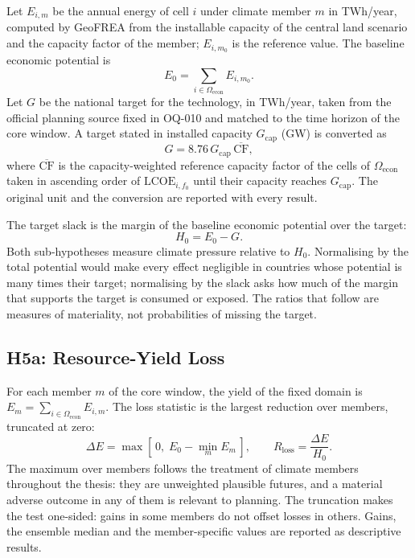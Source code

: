 Let $E_{i,m}$ be the annual energy of cell $i$ under climate member $m$ in
TWh/year, computed by GeoFREA from the installable capacity of the central land
scenario and the capacity factor of the member; $E_{i,m_0}$ is the reference
value. The baseline economic potential is
\begin{equation}
    E_{0}=\sum_{i\in\Omega_{\mathrm{econ}}}E_{i,m_0}.
    \label{eq:h5_baseline}
\end{equation}
Let $G$ be the national target for the technology, in TWh/year, taken from the
official planning source fixed in OQ-010 and matched to the time horizon of the
core window. A target stated in installed capacity $G_{\mathrm{cap}}$ (GW) is
converted as
\begin{equation}
    G=8.76\,G_{\mathrm{cap}}\,\overline{\mathrm{CF}},
    \label{eq:h5_conversion}
\end{equation}
where $\overline{\mathrm{CF}}$ is the capacity-weighted reference capacity factor
of the cells of $\Omega_{\mathrm{econ}}$ taken in ascending order of
$\mathrm{LCOE}_{i,f_0}$ until their capacity reaches $G_{\mathrm{cap}}$. The
original unit and the conversion are reported with every result.

The target slack is the margin of the baseline economic potential over the
target:
\begin{equation}
    H_0=E_0-G .
    \label{eq:h5_slack}
\end{equation}
Both sub-hypotheses measure climate pressure relative to $H_0$. Normalising by
the total potential would make every effect negligible in countries whose
potential is many times their target; normalising by the slack asks how much of
the margin that supports the target is consumed or exposed. The ratios that
follow are measures of materiality, not probabilities of missing the target.

\subsection{H5a: Resource-Yield Loss}
\label{subsec:h5a}

For each member $m$ of the core window, the yield of the fixed domain is
$E_m=\sum_{i\in\Omega_{\mathrm{econ}}}E_{i,m}$. The loss statistic is the largest
reduction over members, truncated at zero:
\begin{equation}
    \Delta E=\max\!\left[\,0,\;E_0-\min_{m}E_m\,\right],
    \qquad
    R_{\mathrm{loss}}=\frac{\Delta E}{H_0}.
    \label{eq:h5a_statistic}
\end{equation}
The maximum over members follows the treatment of climate members throughout the
thesis: they are unweighted plausible futures, and a material adverse outcome in
any of them is relevant to planning. The truncation makes the test one-sided:
gains in some members do not offset losses in others. Gains, the ensemble median
and the member-specific values are reported as descriptive results.

